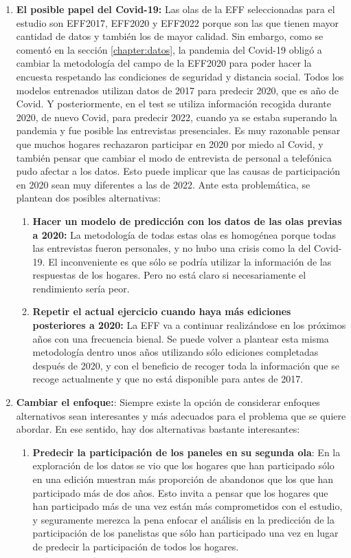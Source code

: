 \begin{enumerate}
    \item \textbf{El posible papel del Covid-19:} Las olas de la EFF seleccionadas para el estudio son EFF2017, EFF2020 y EFF2022 porque son las que tienen mayor cantidad de datos y también los de mayor calidad. Sin embargo, como se comentó en la sección \ref{chapter:datos}, la pandemia del Covid-19 obligó a cambiar la metodología del campo de la EFF2020 para poder hacer la encuesta respetando las condiciones de seguridad y distancia social. Todos los modelos entrenados utilizan datos de 2017 para predecir 2020, que es año de Covid. Y posteriormente, en el test se utiliza información recogida durante 2020, de nuevo Covid, para predecir 2022, cuando ya se estaba superando la pandemia y fue posible las entrevistas presenciales. Es muy razonable pensar que muchos hogares rechazaron participar en 2020 por miedo al Covid, y también pensar que cambiar el modo de entrevista de personal a telefónica pudo afectar a los datos. Esto puede implicar que las causas de participación en 2020 sean muy diferentes a las de 2022. Ante esta problemática, se plantean dos posibles alternativas:
    \begin{enumerate}[noitemsep]
        \item \textbf{Hacer un modelo de predicción con los datos de las olas previas a 2020:} La metodología de todas estas olas es homogénea porque todas las entrevistas fueron personales, y no hubo una crisis como la del Covid-19. El inconveniente es que sólo se podría utilizar la información de las respuestas de los hogares. Pero no está claro si necesariamente el rendimiento sería peor.
        \item \textbf{Repetir el actual ejercicio cuando haya más ediciones posteriores a 2020:} La EFF va a continuar realizándose en los próximos años con una frecuencia bienal. Se puede volver a plantear esta misma metodología dentro unos años utilizando sólo ediciones completadas después de 2020, y con el beneficio de recoger toda la información que se recoge actualmente y que no está disponible para antes de 2017.
    \end{enumerate}
    \item\textbf{Cambiar el enfoque:}: Siempre existe la opción de considerar enfoques alternativos sean interesantes y más adecuados para el problema que se quiere abordar. En ese sentido, hay dos alternativas bastante interesantes:
    \begin{enumerate}[noitemsep]
        \item \textbf{Predecir la participación de los paneles en su segunda ola}: En la exploración de los datos se vio que los hogares que han participado sólo en una edición muestran más proporción de abandonos que los que han participado más de dos años. Esto invita a pensar que los hogares que han participado más de una vez están más comprometidos con el estudio, y seguramente merezca la pena enfocar el análisis en la predicción de la participación de los panelistas que sólo han participado una vez en lugar de predecir la participación de todos los hogares.

\end{enumerate}
\end{enumerate}
